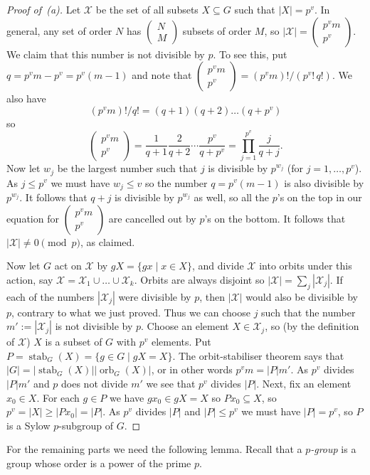 \documentclass{amsart}
\DeclareMathOperator{\orb}      {orb}
\DeclareMathOperator{\stab}     {stab}
\newcommand{\bcf}[2]{\left(\begin{array}{c}{#1}\\{#2}\end{array}\right)}
\newcommand{\st}        {\;|\;}
\newcommand{\sse}       {\subseteq}
\newcommand{\CX}        {{\mathcal{X}}}
\renewcommand{\:}{\colon}
\theoremstyle{definition}
\begin{document}
\begin{proof}[Proof of~(a)]
 Let $\CX$ be the set of all subsets $X\sse G$ such that $|X|=p^v$.
 In general, any set of order $N$ has $\bcf{N}{M}$ subsets of order
 $M$, so $|\CX|=\bcf{p^vm}{p^v}$.  We claim that this number is not
 divisible by $p$.  To see this, put $q=p^vm-p^v=p^v(m-1)$ and note
 that $\bcf{p^vm}{p^v}=(p^vm)!/(p^v!\,q!)$.  We also have
 \[ (p^vm)!/q!=(q+1)(q+2)\ldots(q+p^v) \]
 so
 \[ \bcf{p^vm}{p^v} =
    \frac{1}{q+1}\frac{2}{q+2}\cdots\frac{p^v}{q+p^v} =
    \prod_{j=1}^{p^v} \frac{j}{q+j}.
 \]
 Now let $w_j$ be the largest number such that $j$ is divisible by
 $p^{w_j}$ (for $j=1,\ldots,p^v$).  As $j\leq p^v$ we must have
 $w_j\leq v$ so the number $q=p^v(m-1)$ is also divisible by
 $p^{w_j}$.  It follows that $q+j$ is divisible by $p^{w_j}$ as well,
 so all the $p$'s on the top in our equation for $\bcf{p^vm}{p^v}$ are
 cancelled out by $p$'s on the bottom.  It follows that
 $|\CX|\neq 0\pmod{p}$, as claimed.

 Now let $G$ act on $\CX$ by $gX=\{gx\st x\in X\}$, and divide $\CX$
 into orbits under this action, say $\CX=\CX_1\cup\ldots\cup\CX_k$.
 Orbits are always disjoint so $|\CX|=\sum_j|\CX_j|$.  If each of the
 numbers $|\CX_j|$ were divisible by $p$, then $|\CX|$ would also be
 divisible by $p$, contrary to what we just proved.  Thus we can
 choose $j$ such that the number $m':=|\CX_j|$ is not divisible by
 $p$.  Choose an element $X\in\CX_j$, so (by the definition of $\CX$)
 $X$ is a subset of $G$ with $p^v$ elements.  Put
 $P=\stab_G(X)=\{g\in G\st gX=X\}$.  The orbit-stabiliser theorem says
 that $|G|=|\stab_G(X)||\orb_G(X)|$, or in other words $p^vm=|P|m'$.
 As $p^v$ divides $|P|m'$ and $p$ does not divide $m'$ we see that
 $p^v$ divides $|P|$.  Next, fix an element $x_0\in X$.  For each
 $g\in P$ we have $gx_0\in gX=X$ so $Px_0\sse X$, so
 $p^v=|X|\geq|Px_0|=|P|$.  As $p^v$ divides $|P|$ and $|P|\leq p^v$ we
 must have $|P|=p^v$, so $P$ is a Sylow $p$-subgroup of $G$.
\end{proof}

For the remaining parts we need the following lemma.  Recall that a
\emph{$p$-group} is a group whose order is a power of the prime $p$.
\end{document}
